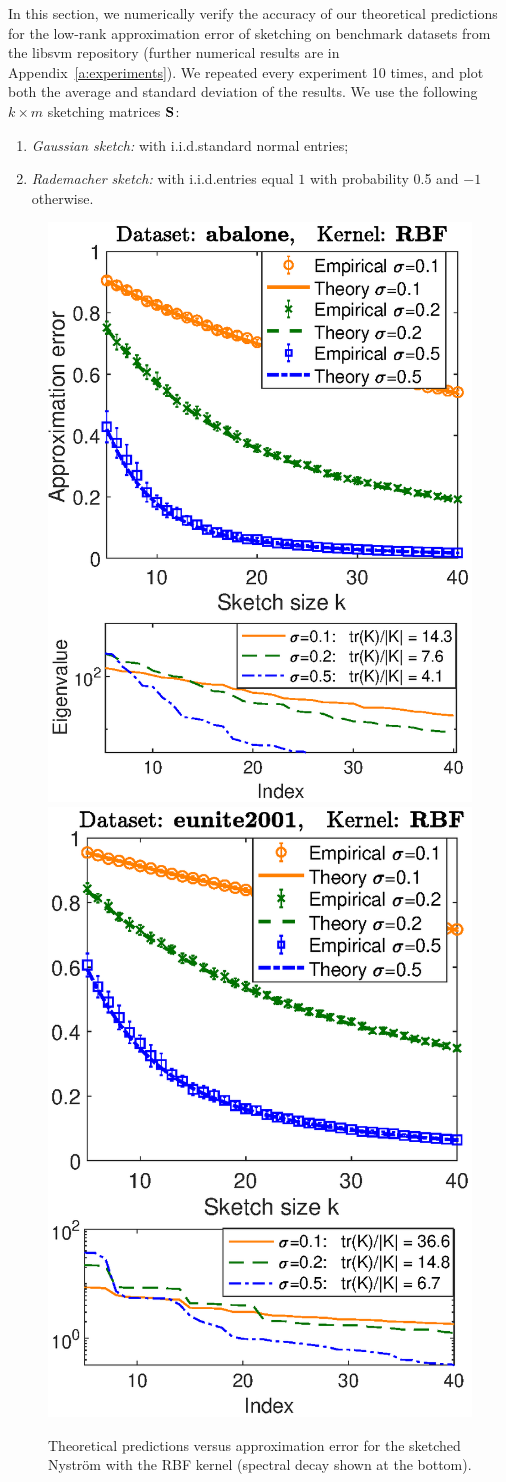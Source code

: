 \documentclass[thesis.tex]{subfiles}
\begin{document}
In this section, we numerically verify the accuracy of our theoretical
predictions for the low-rank approximation error of sketching on
benchmark datasets from the libsvm repository 
\cite{libsvm} (further numerical results are in
Appendix~\ref{a:experiments}). We repeated every experiment 10 times,
and plot 
both the average and standard deviation of the results. We use the
following $k\times m$ sketching matrices $\S$:\vspace{-1mm}
\begin{enumerate}
\item \emph{Gaussian sketch:} with i.i.d.\@ standard normal entries;
\item \emph{Rademacher sketch:} with
  i.i.d.\@ entries equal $1$ with probability 0.5 and $-1$ otherwise.
\end{enumerate}
\vspace{-2mm}

\ifisarxiv
\begin{figure}
  \centering
\includegraphics[width=.43\textwidth]{abalone-nystrom}\nobreak\includegraphics[width=.43\textwidth]{eunite-nystrom}
  \caption{Theoretical predictions versus approximation error for the
    sketched Nystr\"om with the RBF kernel
    (spectral decay shown at the bottom).}\label{f:nystrom}
\end{figure}
\fi
\end{document}
